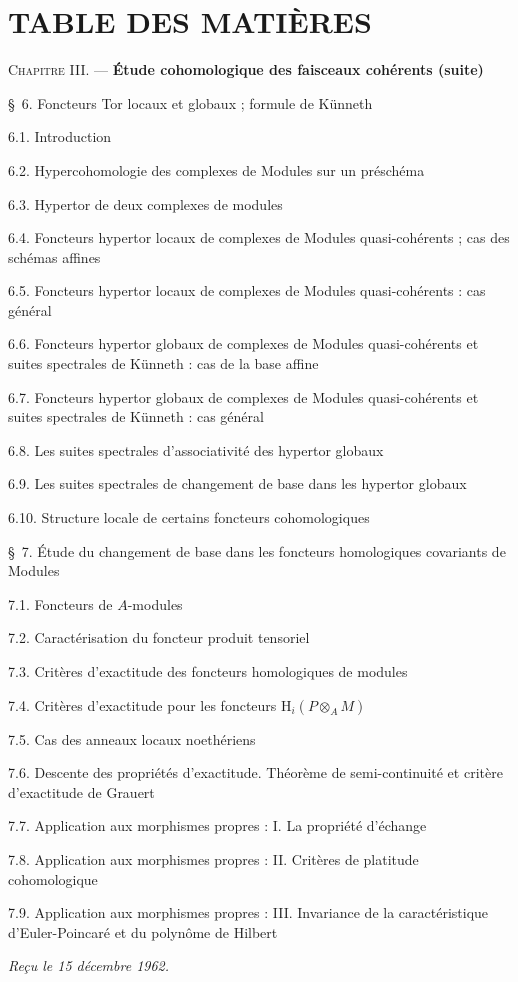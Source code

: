 \section*{TABLE DES MATIÈRES}

\begin{flushleft}
\textsc{Chapitre III.} --- \textbf{Étude cohomologique des faisceaux cohérents
(suite)} 

\medskip
\S~6. Foncteurs Tor locaux et globaux ; formule de Künneth 

6.1. Introduction 

6.2. Hypercohomologie des complexes de Modules sur un préschéma 

6.3. Hypertor de deux complexes de modules 

6.4. Foncteurs hypertor locaux de complexes de Modules quasi-cohérents ; cas
des schémas affines 

6.5. Foncteurs hypertor locaux de complexes de Modules quasi-cohérents : cas
général 

6.6. Foncteurs hypertor globaux de complexes de Modules quasi-cohérents et
suites spectrales de Künneth : cas de la base affine 

6.7. Foncteurs hypertor globaux de complexes de Modules quasi-cohérents et
suites spectrales de Künneth : cas général 

6.8. Les suites spectrales d'associativité des hypertor globaux 

6.9. Les suites spectrales de changement de base dans les hypertor globaux

6.10. Structure locale de certains foncteurs cohomologiques 

\medskip
\S~7. Étude du changement de base dans les foncteurs homologiques covariants
de Modules 

7.1. Foncteurs de $A$-modules 

7.2. Caractérisation du foncteur produit tensoriel 

7.3. Critères d'exactitude des foncteurs homologiques de modules 

7.4. Critères d'exactitude pour les foncteurs
$\mathrm H_i(P\otimes_A M)$ 

7.5. Cas des anneaux locaux noethériens 

7.6. Descente des propriétés d'exactitude. Théorème de semi-continuité et
critère d'exactitude de Grauert 

7.7. Application aux morphismes propres : I. La propriété d'échange

7.8. Application aux morphismes propres : II. Critères de platitude
cohomologique 

7.9. Application aux morphismes propres : III. Invariance de la
caractéristique d'Euler-Poincaré et du polynôme de Hilbert 

\begin{flushright}
\emph{Reçu le 15 décembre 1962.}
\end{flushright}
\end{flushleft}

\clearpage
\thispagestyle{empty}
\null
\clearpage

